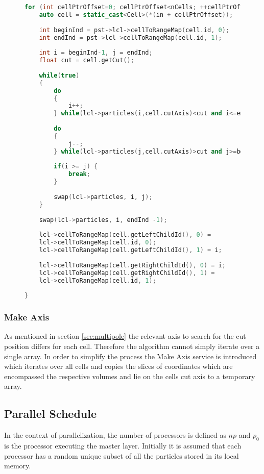 \documentclass[]{article}
\begin{document}
\begin{figure}[H] 
	\begin{lstlisting}[language=c++, caption=Partition Service, label=partition]
for (int cellPtrOffset=0; cellPtrOffset<nCells; ++cellPtrOffset){
	auto cell = static_cast<Cell>(*(in + cellPtrOffset));
	
	int beginInd = pst->lcl->cellToRangeMap(cell.id, 0);
	int endInd = pst->lcl->cellToRangeMap(cell.id, 1);
	
	int i = beginInd-1, j = endInd;
	float cut = cell.getCut();
	
	while(true)
	{
		do
		{
			i++;
		} while(lcl->particles(i,cell.cutAxis)<cut and i<=endInd);
		
		do
		{
			j--;
		} while(lcl->particles(j,cell.cutAxis)>cut and j>=beginInd);
		
		if(i >= j) {
			break;
		}
		
		swap(lcl->particles, i, j);
	}
	
	swap(lcl->particles, i, endInd -1);
	
	lcl->cellToRangeMap(cell.getLeftChildId(), 0) =
	lcl->cellToRangeMap(cell.id, 0);
	lcl->cellToRangeMap(cell.getLeftChildId(), 1) = i;
	
	lcl->cellToRangeMap(cell.getRightChildId(), 0) = i;
	lcl->cellToRangeMap(cell.getRightChildId(), 1) =
	lcl->cellToRangeMap(cell.id, 1);
	
}
	\end{lstlisting}
\end{figure}


\subsubsection{Make Axis}

As mentioned in section \ref{sec:multipole} the relevant axis to search for the cut position differs for each cell. Therefore the algorithm cannot simply iterate over a single array. In order to simplify the process the Make Axis service is introduced which iterates over all cells and copies the slices of coordinates which are encompassed the respective volumes and lie on the cells cut axis to a temporary array.

\subsection{Parallel Schedule}\label{sec:parellize-orb}

In the context of parallelization, the number of processors is defined as $np$ and $p_0$ is the processor executing the master layer. 
Initially it is assumed that each processor has a random unique subset of all the particles stored in its local memory.
\end{document}

